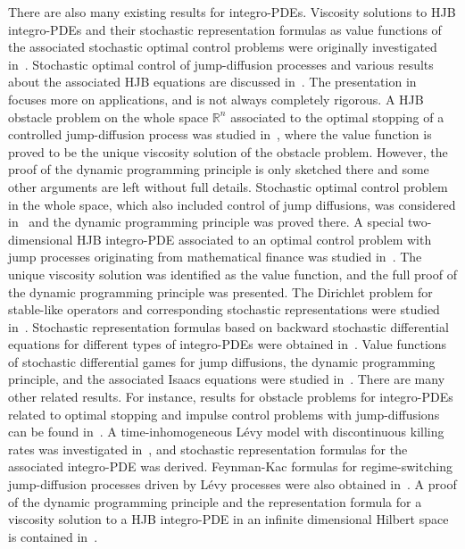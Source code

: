 \documentclass[amscd,amssymb,11pt]{article}
\numberwithin{theorem}{section}
\numberwithin{equation}{section}
\begin{document}
There are also many existing results for integro-PDEs. Viscosity solutions to HJB integro-PDEs and their stochastic representation formulas as value functions of the associated stochastic optimal control problems were originally investigated in~\cite{Soner:1986,Soner:1988}. Stochastic optimal control of jump-diffusion processes and various results about the associated HJB equations are discussed in~\cite{OksendalSulem:2007}. The presentation in~\cite{OksendalSulem:2007} focuses more on applications, and is not always completely rigorous. A HJB obstacle problem on the whole space $\mathbb{R}^{n}$ associated to the optimal stopping of a controlled jump-diffusion process was studied in~\cite{Pham:1998}, where the value function is proved to be the unique viscosity solution of the obstacle problem. However, the proof of the dynamic programming principle is only sketched there and some other arguments are left without full details. Stochastic optimal control problem in the whole space, which also included control of jump diffusions, was considered in~\cite{ElKarouiNguyeneanblanc:1987} and the dynamic
programming principle was proved there. A special two-dimensional HJB integro-PDE associated to an optimal control problem with jump processes originating from mathematical finance was studied in~\cite{Ishikawa:2004}. The unique viscosity solution was identified as the value function, and the full proof of the dynamic programming principle was presented. The Dirichlet problem for stable-like operators and corresponding stochastic representations were 
studied in~\cite{ArapostathisBiswasCaffarelli:2016}. Stochastic representation formulas based on backward stochastic differential equations for different types of integro-PDEs were obtained in~\cite{BarlesBuckdahnPardoux:1997,BuckdahnHuLi:2011,KharroubiPham:2015,NualartSchoutens:2001}. Value functions of stochastic differential games for jump diffusions, the dynamic programming principle, and the associated Isaacs equations were studied in~\cite{Biswas:2012,BiswasJakobsenKarlsen:2010,BuckdahnHuLi:2011,KoikeSwiech:2013}. There are many other related results. For instance, results for obstacle problems for integro-PDEs related to optimal stopping and impulse control problems with jump-diffusions can be found in~\cite{GarroniMenaldi:2002,Seydel:2009}. A time-inhomogeneous L\'{e}vy model with discontinuous killing rates was investigated in~\cite{Glau:2016}, and stochastic representation formulas for the associated integro-PDE was derived. Feynman-Kac formulas for regime-switching jump-diffusion processes driven by L\'{e}vy processes were also obtained in~\cite{ZhuYinBaran:2015}. A proof of the dynamic programming principle and the representation formula for a viscosity solution to a HJB integro-PDE in an infinite dimensional Hilbert space is contained in~\cite{SwiechZabczyk:2016}.
\end{document}
